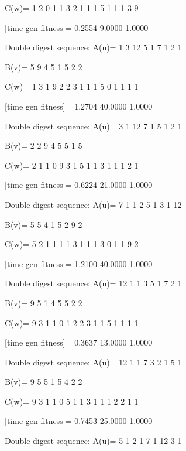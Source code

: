 C(w)=
     1     2     0     1     1     3     2     1     1     1     5     1     1     1     3     9

[time gen fitness]=
    0.2554    9.0000    1.0000

Double digest sequence:
A(u)=
     1     3    12     5     1     7     1     2     1

B(v)=
     5     9     4     5     1     5     2     2

C(w)=
     1     3     1     9     2     2     3     1     1     1     5     0     1     1     1     1

[time gen fitness]=
    1.2704   40.0000    1.0000

Double digest sequence:
A(u)=
     3     1    12     7     1     5     1     2     1

B(v)=
     2     2     9     4     5     5     1     5

C(w)=
     2     1     1     0     9     3     1     5     1     1     3     1     1     1     2     1

[time gen fitness]=
    0.6224   21.0000    1.0000

Double digest sequence:
A(u)=
     7     1     1     2     5     1     3     1    12

B(v)=
     5     5     4     1     5     2     9     2

C(w)=
     5     2     1     1     1     1     3     1     1     1     3     0     1     1     9     2

[time gen fitness]=
    1.2100   40.0000    1.0000

Double digest sequence:
A(u)=
    12     1     1     3     5     1     7     2     1

B(v)=
     9     5     1     4     5     5     2     2

C(w)=
     9     3     1     1     0     1     2     2     3     1     1     5     1     1     1     1

[time gen fitness]=
    0.3637   13.0000    1.0000

Double digest sequence:
A(u)=
    12     1     1     7     3     2     1     5     1

B(v)=
     9     5     5     1     5     4     2     2

C(w)=
     9     3     1     1     0     5     1     1     3     1     1     1     2     2     1     1

[time gen fitness]=
    0.7453   25.0000    1.0000

Double digest sequence:
A(u)=
     5     1     2     1     7     1    12     3     1

